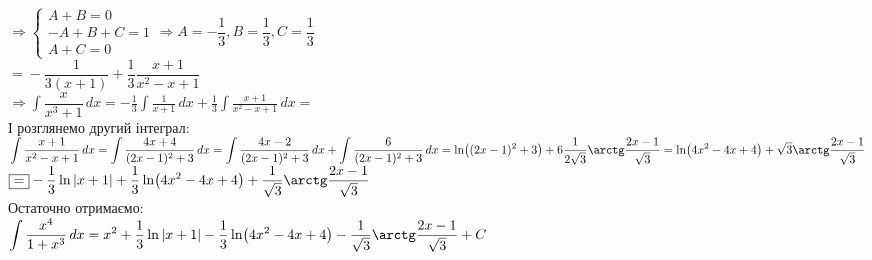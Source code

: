 \documentclass[a4paper, 14pt]{extarticle}
\def\huge{\displaystyle}
\def\bigline{\vspace{5mm}\\}
\def\bigline{\vspace{5mm}\\}
\begin{document}
$\Rightarrow \begin{cases}
A + B = 0 \\
-A + B + C = 1\\
A + C = 0
\end{cases} \Rightarrow A = -\dfrac{1}{3}, B = \dfrac{1}{3}, C = \dfrac{1}{3}$\\
$\boxed{=} -\dfrac{1}{3(x+1)} + \dfrac{1}{3} \dfrac{x+1}{x^2-x+1}$\\
$\Rightarrow \huge \int \dfrac{x}{x^3+1}\,dx = -\frac{1}{3} \int \frac{1}{x+1}\,dx + \frac{1}{3} \int \frac{x+1}{x^2-x+1}\,dx \boxed{=}$\\
І розглянемо другий інтеграл:\\
$\huge \int \frac{x+1}{x^2-x+1}\,dx = \int \frac{4x+4}{(2x-1)^2 + 3}\,dx = \int \frac{4x-2}{(2x-1)^2 +3}\,dx + \int \frac{6}{(2x-1)^2 +3}\,dx = \ln((2x-1)^2+3) + 6 \dfrac{1}{2\sqrt{3}} \arctg \dfrac{2x-1}{\sqrt{3}} = \ln(4x^2-4x+4) + \sqrt{3} \arctg \dfrac{2x-1}{\sqrt{3}}$\\
$\boxed{=} \huge -\dfrac{1}{3} \ln|x+1| + \dfrac{1}{3} \ln(4x^2-4x+4) + \dfrac{1}{\sqrt{3}} \arctg \dfrac{2x-1}{\sqrt{3}}$\\
Остаточно отримаємо:\\
$\huge \int \dfrac{x^4}{1+x^3}\,dx = x^2 + \dfrac{1}{3} \ln|x+1| - \dfrac{1}{3} \ln(4x^2-4x+4) - \dfrac{1}{\sqrt{3}} \arctg \dfrac{2x-1}{\sqrt{3}} + C$
\bigline
\end{document}
